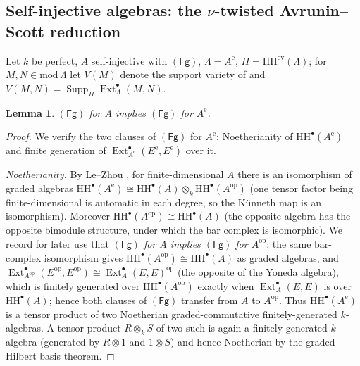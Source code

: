 \documentclass[11pt]{amsart}
\newtheorem{lemma}[theorem]{Lemma}
\theoremstyle{definition}
\newcommand{\HH}{\mathrm{HH}}
\newcommand{\Ext}{\operatorname{Ext}}
\newcommand{\Ae}{A^{\mathrm{e}}}
\newcommand{\Supp}{\operatorname{Supp}}
\newcommand{\kk}{k}
\newcommand{\Fg}{\mathsf{(Fg)}}
\begin{document}
\subsection{Self-injective algebras: the $\nu$-twisted Avrunin--Scott
reduction}

Let $\kk$ be perfect, $A$ self-injective with $\Fg$, $\Lambda=\Ae$,
$H=\HH^{\mathrm{ev}}(\Lambda)$; for $M,N\in\mathrm{mod}\,\Lambda$ let $V(M)$
denote the support variety of \cite{EHSST} and
$V(M,N)=\Supp_H\Ext^\bullet_\Lambda(M,N)$.

\begin{lemma}\label{lem:fgenv}
$\Fg$ for $A$ implies $\Fg$ for $\Ae$.
\end{lemma}

\begin{proof}
We verify the two clauses of $\Fg$ for $\Ae$: Noetherianity of
$\HH^\bullet(\Ae)$ and finite generation of $\Ext^\bullet_{\Ae}(E^{\mathrm e},E^{\mathrm e})$
over it.

\emph{Noetherianity.} By Le--Zhou \cite{LeZhou}, for finite-dimensional
$A$ there is an isomorphism of graded algebras
$\HH^\bullet(\Ae)\cong\HH^\bullet(A)\otimes_\kk\HH^\bullet(A^{\mathrm{op}})$
(one tensor factor being finite-dimensional is automatic in each degree, so the
K\"unneth map is an isomorphism). Moreover $\HH^\bullet(A^{\mathrm{op}})\cong
\HH^\bullet(A)$ (the opposite algebra has the opposite bimodule structure,
under which the bar complex is isomorphic). We record for later use that
\emph{$\Fg$ for $A$ implies $\Fg$ for $A^{\mathrm{op}}$}: the same
bar-complex isomorphism gives $\HH^\bullet(A^{\mathrm{op}})\cong\HH^\bullet(A)$
as graded algebras, and $\Ext^\bullet_{A^{\mathrm{op}}}(E^{\mathrm{op}},E^{\mathrm{op}})
\cong\Ext^\bullet_A(E,E)^{\mathrm{op}}$ (the opposite of the Yoneda algebra),
which is finitely generated over $\HH^\bullet(A^{\mathrm{op}})$ exactly when
$\Ext^\bullet_A(E,E)$ is over $\HH^\bullet(A)$; hence both clauses of $\Fg$
transfer from $A$ to $A^{\mathrm{op}}$. Thus $\HH^\bullet(\Ae)$ is a tensor
product of two Noetherian graded-commutative finitely-generated $\kk$-algebras.
A tensor product $R\otimes_\kk S$ of two such is again a finitely generated
$\kk$-algebra (generated by $R\otimes1$ and $1\otimes S$) and hence Noetherian
by the graded Hilbert basis theorem.


\end{proof}
\end{document}
